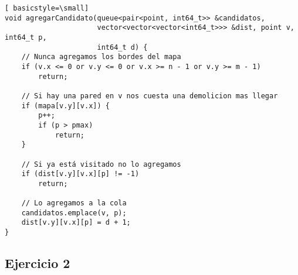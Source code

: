 \begin{lstlisting}[ basicstyle=\small]
void agregarCandidato(queue<pair<point, int64_t>> &candidatos,
                      vector<vector<vector<int64_t>>> &dist, point v, int64_t p,
                      int64_t d) {
    // Nunca agregamos los bordes del mapa
    if (v.x <= 0 or v.y <= 0 or v.x >= n - 1 or v.y >= m - 1)
        return;

    // Si hay una pared en v nos cuesta una demolicion mas llegar
    if (mapa[v.y][v.x]) {
        p++;
        if (p > pmax)
            return;
    }

    // Si ya está visitado no lo agregamos
    if (dist[v.y][v.x][p] != -1)
        return;

    // Lo agregamos a la cola
    candidatos.emplace(v, p);
    dist[v.y][v.x][p] = d + 1;
}
\end{lstlisting}

\newpage
\subsection{Ejercicio 2}


